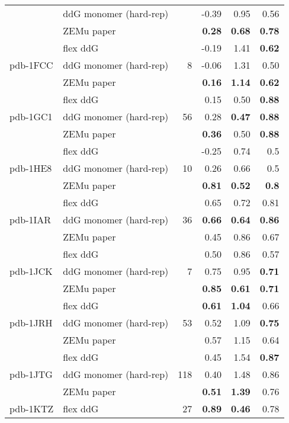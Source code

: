 \begin{longtable}{llrrrr}
 & ddG monomer (hard-rep) & & -0.39 & 0.95 & 0.56  \\
 & ZEMu paper & & \textbf{0.28} & \textbf{0.68} & \textbf{0.78}  \\
\hline
 \multirow{ 3}{*}{pdb-1FCC} & flex ddG & \multirow{ 3}{*}{8} & -0.19 & 1.41 & \textbf{0.62}  \\
 & ddG monomer (hard-rep) & & -0.06 & 1.31 & 0.50  \\
 & ZEMu paper & & \textbf{0.16} & \textbf{1.14} & \textbf{0.62}  \\
\hline
 \multirow{ 3}{*}{pdb-1GC1} & flex ddG & \multirow{ 3}{*}{56} & 0.15 & 0.50 & \textbf{0.88}  \\
 & ddG monomer (hard-rep) & & 0.28 & \textbf{0.47} & \textbf{0.88}  \\
 & ZEMu paper & & \textbf{0.36} & 0.50 & \textbf{0.88}  \\
\hline
 \multirow{ 3}{*}{pdb-1HE8} & flex ddG & \multirow{ 3}{*}{10} & -0.25 & 0.74 & 0.5  \\
 & ddG monomer (hard-rep) & & 0.26 & 0.66 & 0.5  \\
 & ZEMu paper & & \textbf{0.81} & \textbf{0.52} & \textbf{0.8}  \\
\hline
 \multirow{ 3}{*}{pdb-1IAR} & flex ddG & \multirow{ 3}{*}{36} & 0.65 & 0.72 & 0.81  \\
 & ddG monomer (hard-rep) & & \textbf{0.66} & \textbf{0.64} & \textbf{0.86}  \\
 & ZEMu paper & & 0.45 & 0.86 & 0.67  \\
\hline
 \multirow{ 3}{*}{pdb-1JCK} & flex ddG & \multirow{ 3}{*}{7} & 0.50 & 0.86 & 0.57  \\
 & ddG monomer (hard-rep) & & 0.75 & 0.95 & \textbf{0.71}  \\
 & ZEMu paper & & \textbf{0.85} & \textbf{0.61} & \textbf{0.71}  \\
\hline
 \multirow{ 3}{*}{pdb-1JRH} & flex ddG & \multirow{ 3}{*}{53} & \textbf{0.61} & \textbf{1.04} & 0.66  \\
 & ddG monomer (hard-rep) & & 0.52 & 1.09 & \textbf{0.75}  \\
 & ZEMu paper & & 0.57 & 1.15 & 0.64  \\
\hline
 \multirow{ 3}{*}{pdb-1JTG} & flex ddG & \multirow{ 3}{*}{118} & 0.45 & 1.54 & \textbf{0.87}  \\
 & ddG monomer (hard-rep) & & 0.40 & 1.48 & 0.86  \\
 & ZEMu paper & & \textbf{0.51} & \textbf{1.39} & 0.76  \\
\hline
 \multirow{ 3}{*}{pdb-1KTZ} & flex ddG & \multirow{ 3}{*}{27} & \textbf{0.89} & \textbf{0.46} & 0.78  \\

\end{longtable}
